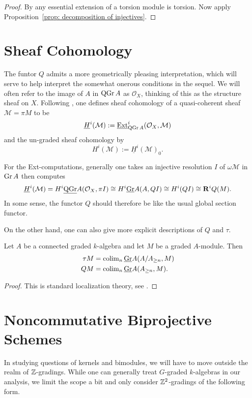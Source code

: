 \begin{proof}
  By \parencite[Prop 2.2]{AZ94} any essential extension of a torsion module is torsion.
  Now apply Proposition~\ref{prop: decomposition of injectives}.
\end{proof}

\section{Sheaf Cohomology}

The funtor \(Q\) admits a more geometrically pleasing interpretation, which will serve to help interpret the somewhat onerous conditions in the sequel.
We will often refer to the image of \(A\) in \(\operatorname{QGr}A\) as \(\mathcal{O}_X\), thinking of this as the structure sheaf on \(X\).
Following \parencite{AZ94}, one defines sheaf cohomology of a quasi-coherent sheaf \(\mathcal{M} = \pi{M}\) to be
\[\underline{H}^i(\mathcal{M}) := \operatorname{\underline{Ext}}^i_{\operatorname{QGr}A}(\mathcal{O}_X, \mathcal{M})\]
and the un-graded sheaf cohomology by
\[H^i(\mathcal{M}) := \underline{H}^i(\mathcal{M})_0.\]

For the Ext-computations, generally one takes an injective resolution \(I\) of \(\omega\mathcal{M}\) in \(\operatorname{Gr}A\) then computes
\[\underline{H}^i(\mathcal{M}) = H^i\underline{\operatorname{QGr}}A(\mathcal{O}_X, \pi{I}) \cong H^i\underline{\operatorname{Gr}}A(A, QI) \cong H^i(QI) \cong \mathbf{R}^iQ(M).\]
In some sense, the functor \(Q\) should therefore be like the usual global section functor.

On the other hand, one can also give more explicit descriptions of \(Q\) and \(\tau\). 

\begin{proposition}\label{prop: explicit Q and tau}
  Let \(A\) be a connected graded \(k\)-algebra and let \(M\) be a graded \(A\)-module. Then 
  \begin{align*}
    \tau M & = \operatorname{colim}_n \underline{\operatorname{Gr}}A(A/A_{\geq n}, M) \\
    Q M & = \operatorname{colim}_n \underline{\operatorname{Gr}}A(A_{\geq n}, M).
  \end{align*}
\end{proposition}

\begin{proof}
  This is standard localization theory, see \parencite{Stenstrom75}.
\end{proof}

\section{Noncommutative Biprojective Schemes}
In studying questions of kernels and bimodules, we will have to move outside the realm of \(\mathbb{Z}\)-gradings. While one can generally treat \(G\)-graded \(k\)-algebras in our analysis, we limit the scope a bit and only consider \(\mathbb{Z}^2\)-gradings of the following form.

